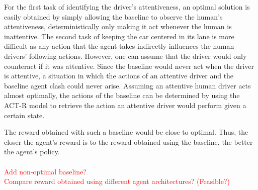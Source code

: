 For the first task of identifying the driver's attentiveness, an optimal solution is easily obtained by simply allowing the baseline to observe the human's attentiveness, deterministically only making it act whenever the human is inattentive. The second task of keeping the car centered in its lane is more difficult as any action that the agent takes indirectly influences the human drivers' following actions. However, one can assume that the driver would only counteract if it was attentive. Since the baseline would never act when the driver is attentive, a situation in which the actions of an attentive driver and the baseline agent clash could never arise. Assuming an attentive human driver acts almost optimally, the actions of the baseline can be determined by using the ACT-R model to retrieve the action an attentive driver would perform given a certain state.

The reward obtained with such a baseline would be close to optimal. Thus, the closer the agent's reward is to the reward obtained using the baseline, the better the agent's policy.\\
\\
\textcolor{red}{Add non-optimal baseline?}\\
\textcolor{red}{Compare reward obtained using different agent architectures? (Feasible?)}














